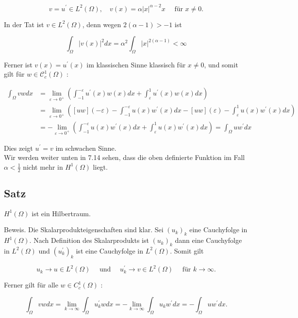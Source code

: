 \documentclass[10pt, letterpaper]{article}
\begin{document}
$$
v=u^{\prime} \in L^{2}(\Omega), \quad v(x)=\alpha|x|^{\alpha-2} x \quad \text { für } x \neq 0 .
$$

In der Tat ist $v \in L^{2}(\Omega)$, denn wegen $2(\alpha-1)>-1$ ist

$$
\int_{\Omega}|v(x)|^{2} d x=\alpha^{2} \int_{\Omega}|x|^{2(\alpha-1)}<\infty
$$

Ferner ist $v(x)=u^{\prime}(x)$ im klassischen Sinne klassisch für $x \neq 0$, und somit gilt für $w \in \mathcal{C}_{c}^{1}(\Omega)$ :

$$
\begin{aligned}
\int_{\Omega} v w d x & =\lim _{\varepsilon \rightarrow 0^{+}}\left(\int_{-1}^{-\varepsilon} u^{\prime}(x) w(x) d x+\int_{\varepsilon}^{1} u^{\prime}(x) w(x) d x\right) \\
& =\lim _{\varepsilon \rightarrow 0^{+}}\left([u w](-\varepsilon)-\int_{-1}^{-\varepsilon} u(x) w^{\prime}(x) d x-[u w](\varepsilon)-\int_{\varepsilon}^{1} u(x) w^{\prime}(x) d x\right) \\
& =-\lim _{\varepsilon \rightarrow 0^{+}}\left(\int_{-1}^{-\varepsilon} u(x) w^{\prime}(x) d x+\int_{\varepsilon}^{1} u(x) w^{\prime}(x) d x\right)=\int_{\Omega} u w^{\prime} d x
\end{aligned}
$$

Dies zeigt $u^{\prime}=v$ im schwachen Sinne.\\
Wir werden weiter unten in 7.14 sehen, dass die oben definierte Funktion im Fall $\alpha<\frac{1}{2}$ nicht mehr in $H^{1}(\Omega)$ liegt.

\subsection*{Satz}
$H^{1}(\Omega)$ ist ein Hilbertraum.

Beweis. Die Skalarprodukteigenschaften sind klar. Sei $\left(u_{k}\right)_{k}$ eine Cauchyfolge in $H^{1}(\Omega)$. Nach Definition des Skalarprodukts ist $\left(u_{k}\right)_{k}$ dann eine Cauchyfolge in $L^{2}(\Omega)$ und $\left(u_{k}^{\prime}\right)_{k}$ ist eine Cauchyfolge in $L^{2}(\Omega)$. Somit gilt

$$
u_{k} \rightarrow u \in L^{2}(\Omega) \quad \text { und } \quad u_{k}^{\prime} \rightarrow v \in L^{2}(\Omega) \quad \text { für } k \rightarrow \infty .
$$

Ferner gilt für alle $w \in C_{c}^{1}(\Omega)$ :

$$
\int_{\Omega} v w d x=\lim _{k \rightarrow \infty} \int_{\Omega} u_{k}^{\prime} w d x=-\lim _{k \rightarrow \infty} \int_{\Omega} u_{k} w^{\prime} d x=-\int_{\Omega} u w^{\prime} d x .
$$
\end{document}
